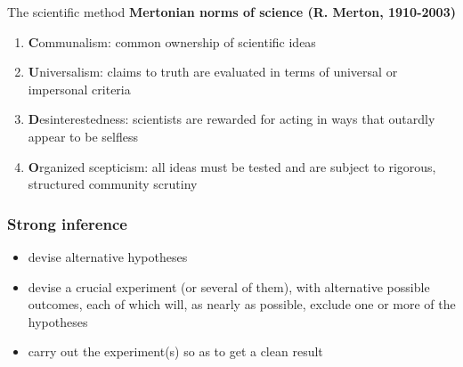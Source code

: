 \documentclass[]{beamer}
\begin{document}
\begin{frame}{The scientific method}
\textbf{Mertonian norms of science (R. Merton, 1910-2003) }
 \begin{enumerate}
   \item[] \textbf{C}ommunalism: common ownership of scientific ideas
   \item[] \textbf{U}niversalism: claims to truth are evaluated in terms of 
universal or impersonal criteria 
   \item[] \textbf{D}esinterestedness: scientists are rewarded for acting in 
ways that outardly appear to be selfless
   \item[] \textbf{O}rganized scepticism: all ideas must be tested and are 
subject to rigorous, structured community scrutiny 
  \end{enumerate}
\end{frame}

\begin{frame}
 \frametitle{Strong inference}
 \begin{itemize}
  \item devise alternative hypotheses
  \item devise a crucial experiment (or several of them), with alternative possible outcomes, each of which will, as nearly as possible, exclude one or more of the hypotheses
 \item carry out the experiment(s) so as to get a clean result
 \end{itemize}
\end{frame}


% 
\end{document}
